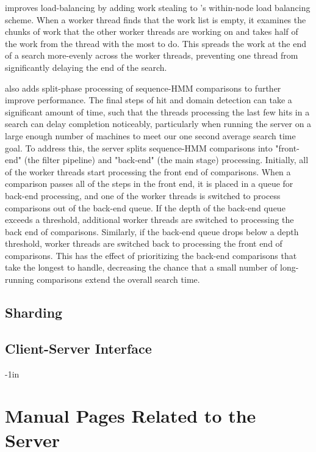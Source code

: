 \documentclass[notoc,justified,openany]{tufte-book}    %
\newcommand{\Hmmserver}{\mono{Hmmserver}\xspace}
\newcommand{\hmmpgmd}{\mono{hmmpgmd}\xspace}
\begin{document}
\Hmmserver improves load-balancing by adding work stealing to \hmmpgmd's within-node load balancing scheme.  When a worker thread finds that the work list is empty, it examines the chunks of work that the other worker threads are working on and takes half of the work from the thread with the most to do.  This spreads the work at the end of a search more-evenly across the worker threads, preventing one thread from significantly delaying the end of the search.

\Hmmserver also adds split-phase processing of sequence-HMM comparisons to further improve performance.  The final steps of hit and domain detection can take a significant amount of time, such that the threads processing the last few hits in a search can delay completion noticeably, particularly when running the server on a large enough number of machines to meet our one second average search time goal.  To address this, the server splits sequence-HMM comparisons into "front-end" (the filter pipeline) and "back-end" (the main stage) processing.  Initially, all of the worker threads start processing the front end of comparisons.  When a comparison passes all of the steps in the front end, it is placed in a queue for back-end processing, and one of the worker threads is switched to process comparisons out of the back-end queue.  If the depth of the back-end queue exceeds a threshold, additional worker threads are switched to processing the back end of comparisons.  Similarly, if the back-end queue drops below a depth threshold, worker threads are switched back to processing the front end of comparisons.  This has the effect of prioritizing the back-end comparisons that take the longest to handle, decreasing the chance that a small number of long-running comparisons extend the overall search time.


\section{Sharding}


\section{Client-Server Interface}

\begin{adjustwidth}{}{-1in}   
\chapter{Manual Pages Related to the Server}

\end{adjustwidth}
\end{document}
